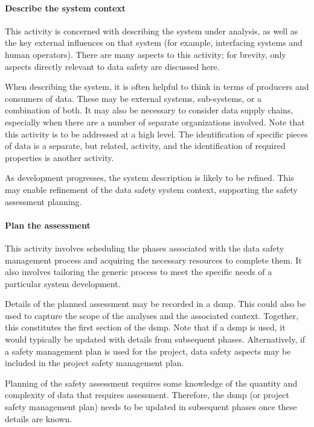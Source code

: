 \paragraph{Describe the system context}
This activity is concerned with describing the system under analysis, as well as the key external influences on that system (for example, interfacing systems and human operators). There are many aspects to this activity; for brevity, only aspects directly relevant to data safety are discussed here.

When describing the system, it is often helpful to think in terms of producers and consumers of data. These may be external systems, sub-systems, or a combination of both. It may also be necessary to consider data supply chains, especially when there are a number of separate organizations involved. Note that this activity is to be addressed at a high level. The identification of specific pieces of data is a separate, but related, activity, and the identification of required properties is another activity.

As development progresses, the system description is likely to be refined. This may enable refinement of the data safety system context, supporting the \gls{safety assessment} planning.

\paragraph{Plan the assessment}
This activity involves scheduling the phases associated with the data safety management process and acquiring the necessary resources to complete them. It also involves \gls{tailoring} the generic process to meet the specific needs of a particular system development. 

Details of the planned assessment may be recorded in a \gls{dsmp}. This could also be used to capture the scope of the analyses and the associated context. Together, this constitutes the first section of the \gls{dsmp}. Note that if a \gls{dsmp} is used, it would typically be updated with details from subsequent phases. Alternatively, if a safety management plan is used for the project, data safety aspects may be included in the project safety management plan. 

Planning of the \gls{safety assessment} requires some knowledge of the quantity and complexity of data that requires assessment. Therefore, the \gls{dsmp} (or project safety management plan) needs to be updated in subsequent phases once these details are known.

